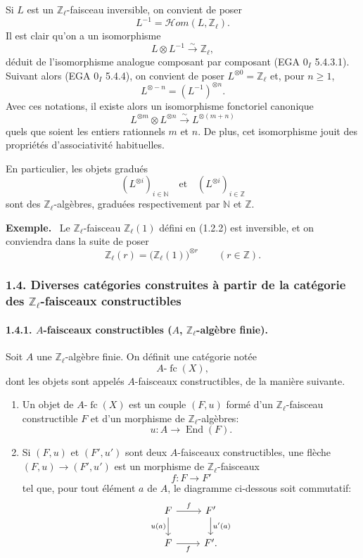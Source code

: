 \documentclass[11pt]{article}
\newenvironment{statement}[1]{\par\medskip\noindent\textbf{#1.}\ }{\par\medskip}
\providecommand{\End}{\operatorname{End}}
\providecommand{\End}{\operatorname{End}}
\providecommand{\cHom}{\mathcal{H}om}
\providecommand{\fc}{\operatorname{fc}}
\begin{document}
Si \(L\) est un \(\mathbb Z_\ell\)-faisceau inversible, on convient de poser
\[
L^{-1}=\cHom(L,\mathbb Z_\ell).
\]
Il est clair qu'on a un isomorphisme
\[
L\otimes L^{-1}\xrightarrow{\sim}\mathbb Z_\ell,
\]
déduit de l'isomorphisme analogue composant par composant (EGA \(0_I\) 5.4.3.1). Suivant alors (EGA \(0_I\) 5.4.4), on convient de poser \(L^{\otimes0}=\mathbb Z_\ell\) et, pour \(n\ge1\),
\[
L^{\otimes -n}=(L^{-1})^{\otimes n}.
\]
Avec ces notations, il existe alors un isomorphisme fonctoriel canonique
\[
L^{\otimes m}\otimes L^{\otimes n}\xrightarrow{\sim}L^{\otimes(m+n)}
\]
quels que soient les entiers rationnels \(m\) et \(n\). De plus, cet isomorphisme jouit des propriétés d'associativité habituelles.

En particulier, les objets gradués
\[
(L^{\otimes i})_{i\in\mathbb N}\quad\text{et}\quad(L^{\otimes i})_{i\in\mathbb Z}
\]
sont des \(\mathbb Z_\ell\)-algèbres, graduées respectivement par \(\mathbb N\) et \(\mathbb Z\).

\begin{statement}{Exemple}
Le \(\mathbb Z_\ell\)-faisceau \(\mathbb Z_\ell(1)\) défini en (1.2.2) est inversible, et on conviendra dans la suite de poser
\[
\mathbb Z_\ell(r)=\bigl(\mathbb Z_\ell(1)\bigr)^{\otimes r}\qquad (r\in\mathbb Z).
\]
\end{statement}

\subsubsection*{1.4. Diverses catégories construites à partir de la catégorie des \(\mathbb Z_\ell\)-faisceaux constructibles}

\paragraph{1.4.1. \(A\)-faisceaux constructibles (\(A\), \(\mathbb Z_\ell\)-algèbre finie).}
Soit \(A\) une \(\mathbb Z_\ell\)-algèbre finie. On définit une catégorie notée
\[
A\text{-}\fc(X),
\]
dont les objets sont appelés \(A\)-faisceaux constructibles, de la manière suivante.

\begin{enumerate}[label=(\roman*)]
\item Un objet de \(A\text{-}\fc(X)\) est un couple \((F,u)\) formé d'un \(\mathbb Z_\ell\)-faisceau constructible \(F\) et d'un morphisme de \(\mathbb Z_\ell\)-algèbres:
\[
u:A\longrightarrow \End(F).
\]
\item Si \((F,u)\) et \((F',u')\) sont deux \(A\)-faisceaux constructibles, une flèche \((F,u)\to(F',u')\) est un morphisme de \(\mathbb Z_\ell\)-faisceaux
\[
f:F\longrightarrow F'
\]
tel que, pour tout élément \(a\) de \(A\), le diagramme ci-dessous soit commutatif:
\[
\begin{tikzcd}
F \arrow[r,"f"] \arrow[d,"u(a)"'] & F' \arrow[d,"u'(a)"]\\
F \arrow[r,"f"'] & F'.
\end{tikzcd}
\]
\end{enumerate}
\end{document}
